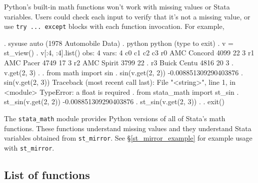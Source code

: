 \documentclass{article}
\begin{document}
Python's built-in math functions won't work with missing values or Stata variables. Users could check each input to verify that it's not a missing value, or use \lstinline{try ... except} blocks with each function invocation. For example,

\begin{stlog}
{\smallskip}
. sysuse auto
(1978 Automobile Data)
{\smallskip}
. python
 python (type {} to exit) 
{\bftt{>>>}}. v = st_view()
{\smallskip}
{\bftt{>>>}}. v[:4, :4].list()
{\smallskip}
  obs: 4
 vars: 4
{\smallskip}
            c0        c1        c2        c3
r0 AMC Concord      4099        22         3
r1   AMC Pacer      4749        17         3
r2  AMC Spirit      3799        22         .
r3 Buick Centu      4816        20         3
{\smallskip}
{\bftt{>>>}}. v.get(2, 3)
.
{\smallskip}
{\bftt{>>>}}. from math import sin
{\smallskip}
{\bftt{>>>}}. sin(v.get(2, 2))
-0.008851309290403876
{\smallskip}
{\bftt{>>>}}. sin(v.get(2, 3))
{\color{red}Traceback (most recent call last):
  File "<string>", line 1, in <module>
TypeError: a float is required}
{\smallskip}
{\bftt{>>>}}. from stata_math import st_sin
{\smallskip}
{\bftt{>>>}}. st_sin(v.get(2, 2))
-0.008851309290403876
{\smallskip}
{\bftt{>>>}}. st_sin(v.get(2, 3))
.
{\smallskip}
{\bftt{>>>}}. exit()
\end{stlog}

The \lstinline{stata_math} module provides Python versions of all of Stata's math functions. These functions understand missing values and they understand Stata variables obtained from \lstinline{st_mirror}. See \S\ref{st_mirror_example} for example usage with \lstinline{st_mirror}.

\subsection{List of functions}
\end{document}

